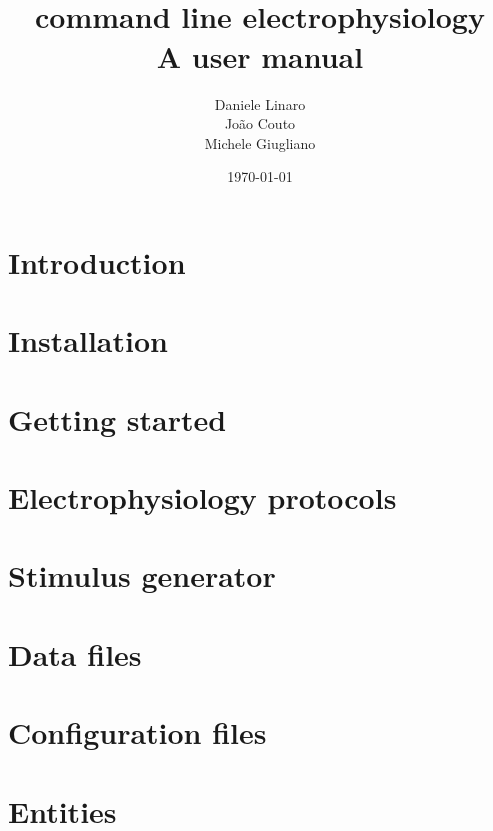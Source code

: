 \documentclass[10pt,a4paper,twoside]{book}
\title{\progname \\ command line electrophysiology \\ A user manual}
\author{Daniele Linaro \\ Jo\~ao Couto \\ Michele Giugliano}
\date{\today}
\begin{document}
\maketitle
\thispagestyle{empty}

\dominitoc
\tableofcontents
\newpage
{}

\chapter{Introduction}
\label{chap:intro}


\chapter{Installation}
\label{chap:installation}


\chapter{Getting started}
\label{chap:start}


\chapter{Electrophysiology protocols}
\label{chap:protocols}


\chapter{Stimulus generator}
\label{chap:stimgen}


\chapter{Data files}
\label{chap:datafiles}


\chapter{Configuration files}
\label{chap:configuration}


%

\chapter{Entities}
\label{chap:entities}

\end{document}
